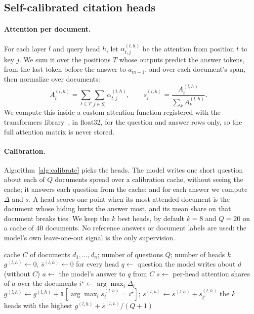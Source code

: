 \documentclass[11pt]{article}
\begin{document}
\subsection{Self-calibrated citation heads}
\label{sec:heads}
\paragraph{Attention per document.} For each layer $l$ and query head $h$, let $\alpha^{(l,h)}_{t,j}$ be the attention from position $t$ to key $j$. We sum it over the positions $T$ whose outputs predict the answer tokens, from the last token before the answer to $a_{m-1}$, and over each document's span, then normalize over documents:
\begin{equation}
A^{(l,h)}_i = \sum_{t \in T} \sum_{j \in S_i} \alpha^{(l,h)}_{t,j}, \qquad s^{(l,h)}_i = \frac{A^{(l,h)}_i}{\sum_k A^{(l,h)}_k}.
\end{equation}
We compute this inside a custom attention function registered with the transformers library~\citep{wolf2020transformers}, in float32, for the question and answer rows only, so the full attention matrix is never stored.

\paragraph{Calibration.} Algorithm~\ref{alg:calibrate} picks the heads. The model writes one short question about each of $Q$ documents spread over a calibration cache, without seeing the cache; it answers each question from the cache; and for each answer we compute $\Delta$ and $s$. A head scores one point when its most-attended document is the document whose hiding hurts the answer most, and its mean share on that document breaks ties. We keep the $k$ best heads, by default $k=8$ and $Q=20$ on a cache of 40 documents. No reference answers or document labels are used: the model's own leave-one-out signal is the only supervision.

\begin{algorithm}[t]
\caption{Calibrating citation heads}
\label{alg:calibrate}
\begin{algorithmic}[1]
\Require cache $C$ of documents $d_1,\dots,d_n$; number of questions $Q$; number of heads $k$
\State $g^{(l,h)} \gets 0$, $\bar{s}^{(l,h)} \gets 0$ for every head
  \State $q \gets$ question the model writes about $d$ (without $C$)
  \State $a \gets$ the model's answer to $q$ from $C$
  \State $s \gets$ per-head attention shares of $a$ over the documents 
  \State $i^\star \gets \arg\max_i \Delta_i$ 
  \State $g^{(l,h)} \gets g^{(l,h)} + \mathbb{1}[\arg\max_i s^{(l,h)}_i = i^\star]$; \quad $\bar{s}^{(l,h)} \gets \bar{s}^{(l,h)} + s^{(l,h)}_{i^\star}$
\EndFor
\State \Return the $k$ heads with the highest $g^{(l,h)} + \bar{s}^{(l,h)} / (Q+1)$
\end{algorithmic}
\end{algorithm}
\end{document}
